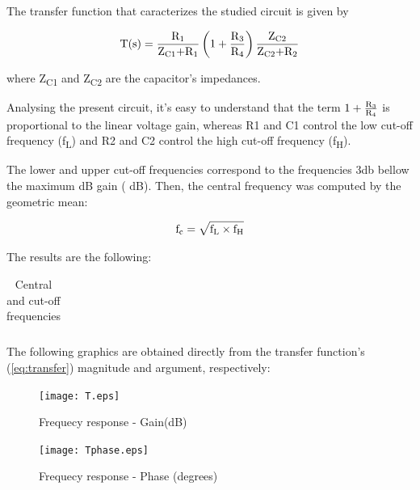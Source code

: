 The transfer function that caracterizes the studied circuit is given by

\begin{equation} \label{eq:transfer}
 \text{T(s)}=\frac{\text{R\textsubscript1}}{\text{Z\textsubscript{C1}+R\textsubscript1}} \left( 1+\frac{\text{R\textsubscript3}}{\text{R\textsubscript4}}\right) \frac{\text{Z\textsubscript{C2}}}{\text{Z\textsubscript{C2}+R\textsubscript2}}
\end{equation}

where Z\textsubscript{C1} and Z\textsubscript{C2} are the capacitor's impedances.

Analysing the present circuit, it's easy to understand that the term $ 1+\frac{\text{R\textsubscript3}}{\text{R\textsubscript4}}$ is proportional to the linear voltage gain, whereas R1 and C1 control the low cut-off frequency (f\textsubscript{L}) and R2 and C2 control the high cut-off frequency (f\textsubscript{H}).

The lower and upper cut-off frequencies correspond to the frequencies 3db bellow the maximum dB gain ( dB). Then, the central frequency was computed by the geometric mean:

\begin{equation}
 \text{f\textsubscript{c}}= \sqrt{\text{f\textsubscript{L}} \times \text{f\textsubscript{H}}}
\end{equation}

The results are the following:

\begin{table}[!htb]
\centering
  \begin{tabular}{|c | c|}
    \hline    
    
 \end{tabular}
 \caption{Central and cut-off frequencies}\label{tab:theo:frequencies}
\end{table}

The following graphics are obtained directly from the transfer function's (\ref{eq:transfer}) magnitude and argument, respectively:


\begin{figure}[h] \centering
  \begin{minipage}{.45\textwidth}
    \texttt{[image: T.eps]}
    \caption{Frequecy response - Gain(dB)}\label{fig:theo:gain}
  \end{minipage}%
    \hspace{2 mm}
  \begin{minipage}{.45\textwidth}
  \centering
    \texttt{[image: Tphase.eps]}
    \caption{Frequecy response - Phase (degrees)}\label{fig:theo:phase}
      \end{minipage}
\end{figure}

